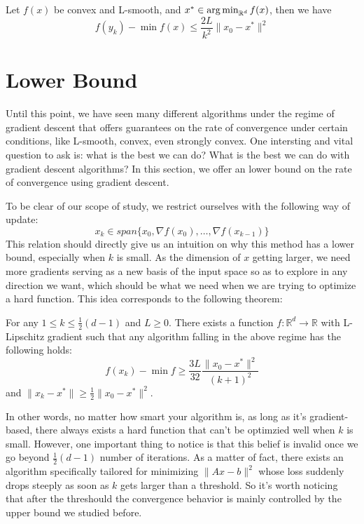 \begin{theorem}
    Let $f(x)$ be convex and L-smooth, and $x^* \in \operatorname*{arg\,min}_{\mathbb{R}^d} f(x)$, then we have
    \begin{equation*}
        f(y_k) - \min f(x) \leq \frac{2L}{k^2} \| x_0 - x^* \|^2
    \end{equation*}
\end{theorem}


\section{Lower Bound}
Until this point, we have seen many different algorithms under the regime of gradient descent that offers guarantees on the rate of convergence under certain conditions, like L-smooth, convex, even strongly convex. One intersting and vital question to ask is: what is the best we can do? What is the best we can do with gradient descent algorithms? In this section, we offer an lower bound on the rate of convergence using gradient descent. 

To be clear of our scope of study, we restrict ourselves with the following way of update:
\begin{equation*}
    x_k \in span \{x_0, \nabla f(x_0), \ldots, \nabla f(x_{k-1})\}
\end{equation*}
This relation should directly give us an intuition on why this method has a lower bound, especially when $k$ is small. As the dimension of $x$ getting larger, we need more gradients serving as a new basis of the input space so as to explore in any direction we want, which should be what we need when we are trying to optimize a hard function. This idea corresponds to the following theorem:

\begin{theorem}
    For any $1 \leq k \leq \frac{1}{2} (d-1)$ and $L \geq 0$. There exists a function $f: \mathbb{R}^d \rightarrow \mathbb{R}$ with L-Lipschitz gradient such that any algorithm falling in the above regime has the following holds:
    \begin{equation*}
        f(x_k) - \min f \geq \frac{3L}{32}\frac{\| x_0 - x^* \|^2}{(k+1)^2}
    \end{equation*}
    and  $\| x_k - x^* \| \geq \frac{1}{2} \|x_0 - x^* \|^2$.
\end{theorem}

In other words, no matter how smart your algorithm is, as long as it's gradient-based, there always exists a hard function that can't be optimzied  well when $k$ is small. However, one important thing to notice is that this belief is invalid once we go beyond $\frac{1}{2}(d-1)$ number of iterations. As a matter of fact, there exists an algorithm specifically tailored for minimizing $\|Ax - b\|^2$ whose loss suddenly drops steeply as soon as $k$ gets larger than a threshold. So it's worth noticing that after the threshould the convergence behavior is mainly controlled by the upper bound we studied before. 